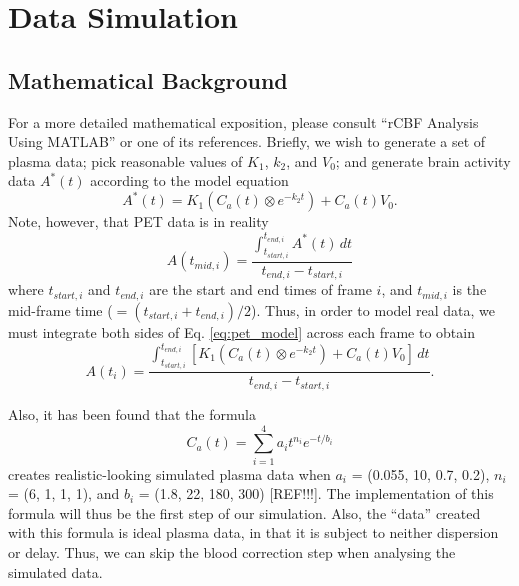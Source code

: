



\section{Data Simulation}

\subsection{Mathematical Background}
For a more detailed mathematical exposition, please consult ``rCBF
Analysis Using MATLAB'' or one of its references.  Briefly, we wish
to generate a set of plasma data; pick reasonable values of $K_{1}$,
$k_{2}$, and $V_{0}$; and generate brain activity data $A^{*}(t)$ according
to the model equation
\begin{equation}
A^{*}(t) = K_{1} (C_{a}(t) \otimes e^{-k_{2}t}) + C_{a}(t)V_{0}.
\label{eq:pet_model}
\end{equation}
Note, however, that PET data is in reality
\begin{equation}
A(t_{mid,i}) = \frac{\int_{t_{start,i}}^{t_{end,i}} A^{*}(t) \,dt}{t_{end,i} - t_{start,i}}
\label{eq:frameint}
\end{equation}
where $t_{start,i}$ and $t_{end,i}$ are the start and end times of
frame $i$, and $t_{mid,i}$ is the mid-frame time ($ = (t_{start,i} +
t_{end,i}) / 2$).  Thus, in order to model real data, we must integrate
both sides of Eq. \ref{eq:pet_model} across each frame to obtain
\begin{equation}
A(t_{i}) = \frac{\int_{t_{start,i}}^{t_{end,i}} [K_{1} (C_{a}(t) \otimes e^{-k_{2}t}) + C_{a}(t)V_{0}] \,dt}{t_{end,i} - t_{start,i}}.
\label{eq:pet_data_model}
\end{equation}

Also, it has been found that the formula
\begin{equation}
C_{a}(t) = \sum_{i=1}^{4} a_{i} t^{n_{i}} e^{-t/b_{i}}
\label{eq:gen_ca}
\end{equation}
creates realistic-looking simulated plasma data when $a_{i}$ = (0.055,
10, 0.7, 0.2), $n_{i}$ = (6, 1, 1, 1), and $b_{i}$ = (1.8, 22, 180, 300)
[REF!!!].  The implementation of this formula will thus be the first step of
our simulation.  Also, the ``data'' created with this formula is ideal
plasma data, in that it is subject to neither dispersion or delay.
Thus, we can skip the blood correction step when analysing the
simulated data.


